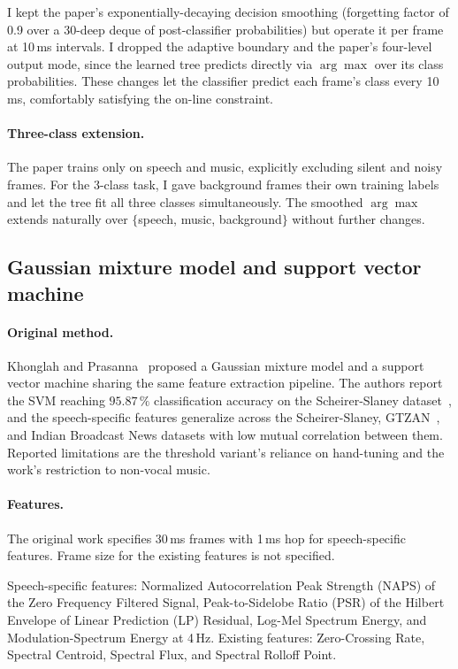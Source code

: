 I kept the paper's exponentially-decaying decision smoothing (forgetting factor of 0.9 over a 30-deep deque of post-classifier probabilities) but operate it per frame at 10\,ms intervals.
I dropped the adaptive boundary and the paper's four-level output mode, since the learned tree predicts directly via $\arg\max$ over its class probabilities.
These changes let the classifier predict each frame's class every 10\,ms, comfortably satisfying the on-line constraint.

\paragraph{Three-class extension.}
The paper trains only on speech and music, explicitly excluding silent and noisy frames.
For the 3-class task, I gave background frames their own training labels and let the tree fit all three classes simultaneously.
The smoothed $\arg\max$ extends naturally over $\{$speech, music, background$\}$ without further changes.

\subsection{Gaussian mixture model and support vector machine}

\paragraph{Original method.}
Khonglah and Prasanna~\cite{khonglah2016gmmsvm} proposed a Gaussian mixture model and a support vector machine sharing the same feature extraction pipeline.
The authors report the SVM reaching $95.87\,\%$ classification accuracy on the Scheirer-Slaney dataset~\cite{scheirer1997discriminator}, and the speech-specific features generalize across the Scheirer-Slaney, GTZAN~\cite{tzanetakis2002gtzan}, and Indian Broadcast News datasets with low mutual correlation between them.
Reported limitations are the threshold variant's reliance on hand-tuning and the work's restriction to non-vocal music.

\paragraph{Features.}
The original work specifies 30\,ms frames with 1\,ms hop for speech-specific features.
Frame size for the existing features is not specified.

Speech-specific features: Normalized Autocorrelation Peak Strength (NAPS) of the Zero Frequency Filtered Signal, Peak-to-Sidelobe Ratio (PSR) of the Hilbert Envelope of Linear Prediction (LP) Residual, Log-Mel Spectrum Energy, and Modulation-Spectrum Energy at 4\,Hz.
Existing features: Zero-Crossing Rate, Spectral Centroid, Spectral Flux, and Spectral Rolloff Point.

